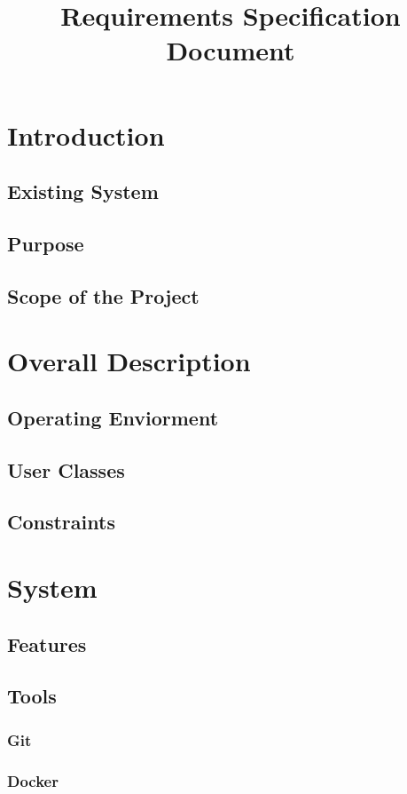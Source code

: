 \documentclass{article}
\title{Requirements Specification Document}
\begin{document}
\maketitle
\newpage
\tableofcontents
\newpage
\section{Introduction}
    \subsection{Existing System}
    \subsection{Purpose}
	\subsection{Scope of the Project}
\section{Overall Description}
    \subsection{Operating Enviorment}
    \subsection{User Classes}
    \subsection{Constraints}
\section{System}
    \subsection{Features}
    \subsection{Tools}
        \subsubsection{Git}
        \subsubsection{Docker}
\end{document}

